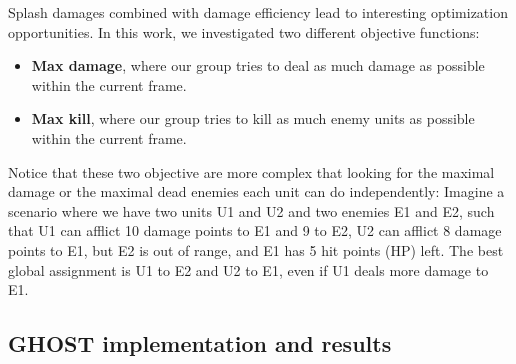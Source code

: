 \documentclass{article}
\newcommand{\ghost}{\textsc{GHOST}\xspace}
\begin{document}
Splash  damages combined  with damage  efficiency lead  to interesting
optimization  opportunities.   In  this   work,  we  investigated  two
different objective functions:
\begin{itemize}
\item {\bf Max  damage}, where our group tries to  deal as much damage
  as possible within the current frame.
\item {\bf  Max kill},  where our  group tries to  kill as  much enemy
  units as possible within the current frame.
\end{itemize}
Notice that these two objective are  more complex that looking for the
maximal  damage  or  the  maximal   dead  enemies  each  unit  can  do
independently: Imagine  a scenario where we  have two units U1  and U2
and two enemies E1  and E2, such that U1 can  afflict 10 damage points
to E1 and 9 to E2, U2 can afflict 8 damage points to E1, but E2 is out
of  range,  and E1  has  5  hit points  (HP)  left.   The best  global
assignment is U1 to  E2 and U2 to E1, even if U1  deals more damage to
E1.

\subsection{\ghost implementation and results}
\end{document}
